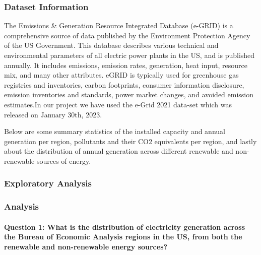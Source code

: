 \documentclass[
]{article}
\begin{document}
\newpage

\hypertarget{dataset-information}{%
\subsubsection{Dataset Information}\label{dataset-information}}

The Emissions \& Generation Resource Integrated Database (e-GRID) is a
comprehensive source of data published by the Environment Protection
Agency of the US Government. This database describes various technical
and environmental parameters of all electric power plants in the US, and
is published annually. It includes emissions, emission rates,
generation, heat input, resource mix, and many other attributes. eGRID
is typically used for greenhouse gas registries and inventories, carbon
footprints, consumer information disclosure, emission inventories and
standards, power market changes, and avoided emission estimates.In our
project we have used the e-Grid 2021 data-set which was released on
January 30th, 2023.

Below are some summary statistics of the installed capacity and annual
generation per region, pollutants and their CO2 equivalents per region,
and lastly about the distribution of annual generation across different
renewable and non-renewable sources of energy.

\newpage

\hypertarget{exploratory-analysis}{%
\subsubsection{Exploratory Analysis}\label{exploratory-analysis}}

\newpage

\hypertarget{analysis}{%
\subsubsection{Analysis}\label{analysis}}

\hypertarget{question-1-what-is-the-distribution-of-electricity-generation-across-the-bureau-of-economic-analysis-regions-in-the-us-from-both-the-renewable-and-non-renewable-energy-sources}{%
\paragraph{Question 1: What is the distribution of electricity
generation across the Bureau of Economic Analysis regions in the US,
from both the renewable and non-renewable energy
sources?}\label{question-1-what-is-the-distribution-of-electricity-generation-across-the-bureau-of-economic-analysis-regions-in-the-us-from-both-the-renewable-and-non-renewable-energy-sources}}
\end{document}
